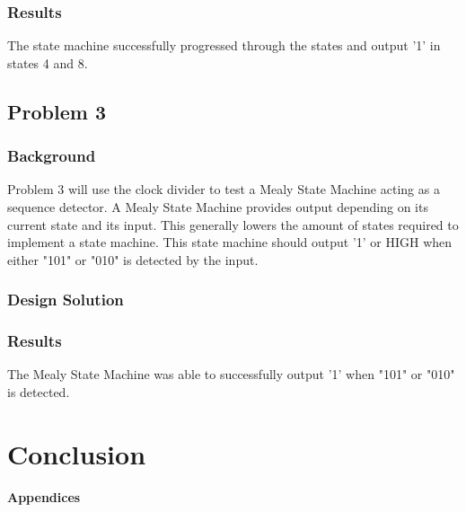 \documentclass[11pt]{article}
\begin{document}
\subsubsection{Results}
The state machine successfully progressed through the states and output '1' in states 4 and 8.

\subsection{Problem 3}

\subsubsection{Background}
Problem 3 will use the clock divider to test a Mealy State Machine acting as a sequence detector. A Mealy State Machine provides output depending on its current state and its input. This generally lowers the amount of states required to implement a state machine. This state machine should output '1' or HIGH when either "101" or "010" is detected by the input.

\subsubsection{Design Solution}


\subsubsection{Results}
The Mealy State Machine was able to successfully output '1' when "101" or "010" is detected.

\section{Conclusion}

\pagebreak

\textbf{Appendices}
\end{document}
